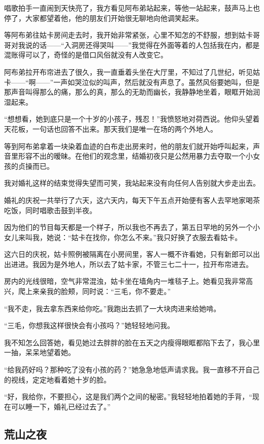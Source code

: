 \par 唱歌拍手一直闹到天快亮了，我方看见阿布弟站起来，等他一站起来，鼓声马上也停了，大家都望着他，他的朋友们开始很无聊地向他调笑起来。
\par 等阿布弟往姑卡房间走去时，我开始非常紧张，心里不知怎的不舒服，想到姑卡哥哥对我说的话——“入洞房还得哭叫——”我觉得在外面等着的人包括我在内，都是混账得可以了，奇怪的是借口风俗就没有人改变它。
\par 阿布弟拉开布帘进去了很久，我一直垂着头坐在大厅里，不知过了几世纪，听见姑卡——“啊——”一声如哭泣似的叫声，然后就没有声息了。虽然风俗要她叫，但是那声音叫得那么的痛，那么的真，那么的无助而幽长，我静静地坐着，眼眶开始润湿起来。
\par “想想看，她到底只是一个十岁的小孩子，残忍！”我愤怒地对荷西说。他仰头望着天花板，一句话也回答不出来。那天我们是唯一在场的两个外地人。
\par 等到阿布弟拿着一块染着血迹的白布走出房来时，他的朋友们就开始呼叫起来，声音里形容不出的暧昧。在他们的观念里，结婚初夜只是公然用暴力去夺取一个小女孩的贞操而已。
\par 我对婚礼这样的结束觉得失望而可笑，我站起来没有向任何人告别就大步走出去。
\par 婚礼的庆祝一共举行了六天，这六天内，每天下午五点开始便有客人去罕地家喝茶吃饭，同时唱歌击鼓到半夜。
\par 因为他们的节目每天都是一个样子，所以我也不再去了，第五日罕地的另外一个小女儿来叫我，她说：“姑卡在找你，你怎么不来。”我只好换了衣服去看姑卡。
\par 这六日的庆祝，姑卡照例被隔离在小房间里，客人一概不许看她，只有新郎可以出出进进。我因为是外地人，所以去了姑卡家，不管三七二十一，拉开布帘进去。
\par 房内的光线很暗，空气非常混浊，姑卡坐在墙角内一堆毯子上。她看见我非常高兴，爬上来亲我的脸颊，同时说：“三毛，你不要走。”
\par “我不走，我去拿东西来给你吃。”我跑出去抓了一大块肉进来给她啃。
\par “三毛，你想我这样很快会有小孩吗？”她轻轻地问我。
\par 我不知怎么回答她，看见她过去胖胖的脸在五天之内瘦得眼眶都陷下去了，我心里一抽，呆呆地望着她。
\par “给我药好吗？那种吃了没有小孩的药？”她急急地低声请求我。我一直移不开自己的视线，定定地看着她十岁的脸。
\par “好，我给你，不要担心，这是我们两个之间的秘密。”我轻轻地拍着她的手背，“现在可以睡一下，婚礼已经过去了。”



\subsection{荒山之夜}

